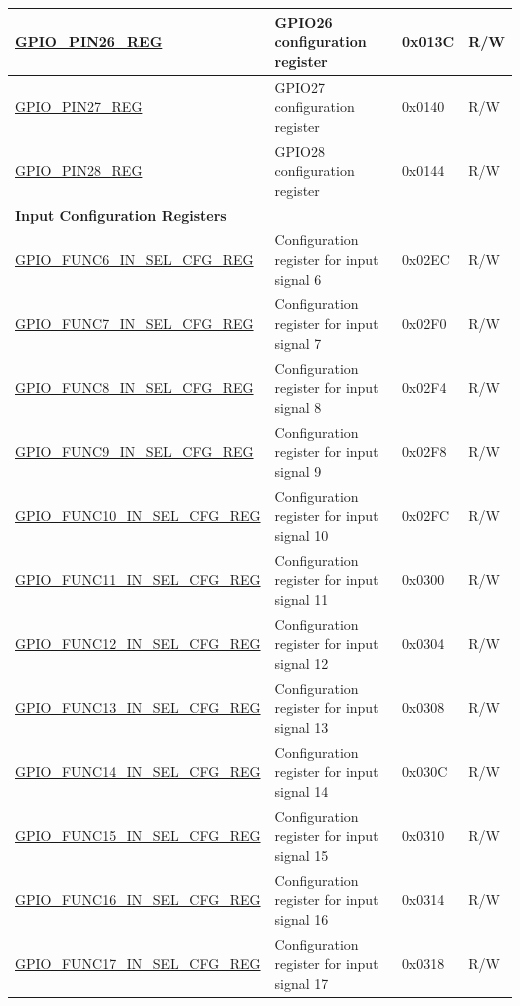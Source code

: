 \begin{longtable}{ | p{5.5cm} | p{7cm} | p{1.3cm} | p{1.9cm} | }
\hyperref[regdesc:GPIOPINNREG]{GPIO\_PIN26\_REG} & GPIO26 configuration register & 0x013C & R/W \\ \hline
\hyperref[regdesc:GPIOPINNREG]{GPIO\_PIN27\_REG} & GPIO27 configuration register & 0x0140 & R/W \\ \hline
\hyperref[regdesc:GPIOPINNREG]{GPIO\_PIN28\_REG} & GPIO28 configuration register & 0x0144 & R/W \\ \hline
\multicolumn{4}{|l|}{\textbf{Input Configuration Registers}} \\ \hline
\hyperref[regdesc:GPIOFUNCMINSELCFGREG]{GPIO\_FUNC6\_IN\_SEL\_CFG\_REG} & Configuration register for input signal 6 & 0x02EC & R/W \\ \hline
\hyperref[regdesc:GPIOFUNCMINSELCFGREG]{GPIO\_FUNC7\_IN\_SEL\_CFG\_REG} & Configuration register for input signal 7 & 0x02F0 & R/W \\ \hline
\hyperref[regdesc:GPIOFUNCMINSELCFGREG]{GPIO\_FUNC8\_IN\_SEL\_CFG\_REG} & Configuration register for input signal 8 & 0x02F4 & R/W \\ \hline
\hyperref[regdesc:GPIOFUNCMINSELCFGREG]{GPIO\_FUNC9\_IN\_SEL\_CFG\_REG} & Configuration register for input signal 9 & 0x02F8 & R/W \\ \hline
\hyperref[regdesc:GPIOFUNCMINSELCFGREG]{GPIO\_FUNC10\_IN\_SEL\_CFG\_REG} & Configuration register for input signal 10 & 0x02FC & R/W \\ \hline
\hyperref[regdesc:GPIOFUNCMINSELCFGREG]{GPIO\_FUNC11\_IN\_SEL\_CFG\_REG} & Configuration register for input signal 11 & 0x0300 & R/W \\ \hline
\hyperref[regdesc:GPIOFUNCMINSELCFGREG]{GPIO\_FUNC12\_IN\_SEL\_CFG\_REG} & Configuration register for input signal 12 & 0x0304 & R/W \\ \hline
\hyperref[regdesc:GPIOFUNCMINSELCFGREG]{GPIO\_FUNC13\_IN\_SEL\_CFG\_REG} & Configuration register for input signal 13 & 0x0308 & R/W \\ \hline
\hyperref[regdesc:GPIOFUNCMINSELCFGREG]{GPIO\_FUNC14\_IN\_SEL\_CFG\_REG} & Configuration register for input signal 14 & 0x030C & R/W \\ \hline
\hyperref[regdesc:GPIOFUNCMINSELCFGREG]{GPIO\_FUNC15\_IN\_SEL\_CFG\_REG} & Configuration register for input signal 15 & 0x0310 & R/W \\ \hline
\hyperref[regdesc:GPIOFUNCMINSELCFGREG]{GPIO\_FUNC16\_IN\_SEL\_CFG\_REG} & Configuration register for input signal 16 & 0x0314 & R/W \\ \hline
\hyperref[regdesc:GPIOFUNCMINSELCFGREG]{GPIO\_FUNC17\_IN\_SEL\_CFG\_REG} & Configuration register for input signal 17 & 0x0318 & R/W \\ \hline

\end{longtable}

